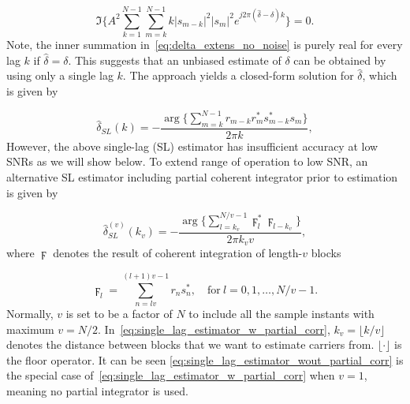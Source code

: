 \begin{equation}
  \label{eq:delta_extens_no_noise}
  \Im\bigg\{A^2\sum_{k=1}^{N-1}\sum_{m=k}^{N-1}k|s_{m-k}|^2|s_m|^2e^{j2\pi (\hat{\delta}-\delta)k}\bigg\}=0.
  \end{equation}
Note, the inner summation in~\eqref{eq:delta_extens_no_noise} is purely real for every lag $k$ if $\hat{\delta}=\delta$.
This suggests that an unbiased estimate of $\delta$ can be obtained by using only a single lag $k$. The approach yields
a closed-form solution for $\hat{\delta}$, which is given by

\begin{equation}
  \label{eq:single_lag_estimator_wout_partial_corr}
  \hat{\delta}_{SL}(k)=-\frac{\arg\big\{\sum_{m=k}^{N-1}r_{m-k}r_m^*s_{m-k}^*s_m\big\}}{2\pi k},
\end{equation}
However, the above single-lag (SL) estimator has insufficient
accuracy at low SNRs as we will show below. To extend range of operation to low SNR,
an alternative SL estimator including partial coherent integrator
prior to estimation is given by

\begin{equation}
  \label{eq:single_lag_estimator_w_partial_corr}
  \hat{\delta}_{SL}^{(v)}(k_v)=-\frac{\arg\big\{\sum_{l=k_v}^{N/v-1}\digamma_l^*\digamma_{l-k_v}\big\}}{2\pi k_vv},
\end{equation}
where $\digamma$ denotes the result of coherent integration of length-$v$ blocks

\begin{equation}
  \label{eq:coherent_integrator}
  \digamma_l=\sum_{n=lv}^{(l+1)v-1}r_ns_n^*, \quad \text{for}~l=0,1,\ldots,N/v{-}1.
\end{equation}
Normally, $v$ is set to be a factor of $N$ to include all the sample instants with maximum $v=N/2$.
In~\eqref{eq:single_lag_estimator_w_partial_corr}, $k_v=\lfloor k/v \rfloor$ denotes
the distance between blocks that we want to estimate carriers from.
$\lfloor \cdot \rfloor$ is the floor operator. It can be seen 
\eqref{eq:single_lag_estimator_wout_partial_corr} is the special case of~\eqref{eq:single_lag_estimator_w_partial_corr}
when $v=1$, meaning no partial integrator is used.




